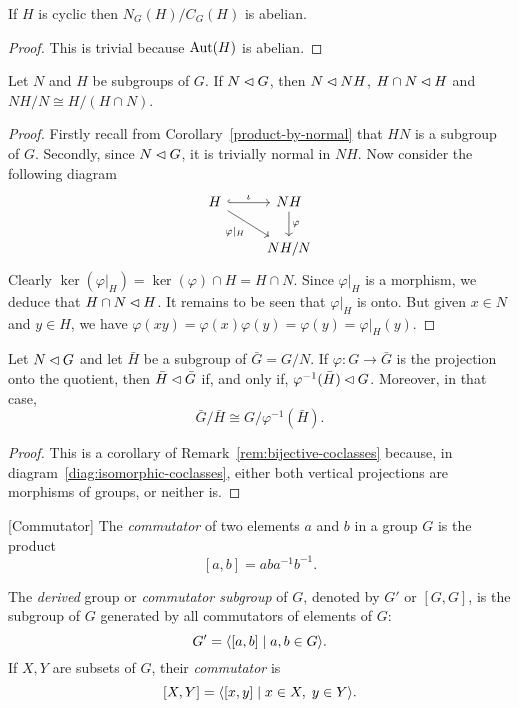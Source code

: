 \begin{cor}
    If\/ $H$ is cyclic then $N_G(H)/C_G(H)$ is abelian. 
\end{cor}

\begin{proof} This is trivial because ${\rm Aut}(H)$ is abelian.  \end{proof}

\begin{prop}\label{prod-quotient}
    Let\/ $N$ and\/ $H$ be subgroups of\/ $G$. If $N \lhd G$, then $N\lhd NH$, $H \cap N \lhd H$ and $NH/N \cong H/(H \cap N)$.
\end{prop}

\begin{proof} Firstly recall from Corollary~\ref{product-by-normal} that $HN$ is a subgroup of $G$. Secondly, since $N\lhd G$, it is trivially normal in $NH$. Now consider the following diagram
$$
    \begin{tikzcd}
        H \arrow[r, "\iota", hook]\arrow[rd,"\varphi|_H", swap]
        & NH \arrow[d, "\varphi"]\\
        & NH/N
    \end{tikzcd}
$$
Clearly $\ker(\varphi|_H)=\ker(\varphi)\cap H= H\cap N$. Since $\varphi|_H$ is a morphism, we deduce that $H\cap N\lhd H$. It remains to be seen that $\varphi|_H$ is onto. But given $x\in N$ and $y\in H$, we have $\varphi(xy) = \varphi(x)\varphi(y) = \varphi(y) = \varphi|_H(y)$.  \end{proof}


\begin{prop}\label{quotient-preserves-normal}
    Let $N\lhd G$ and let $\bar H$ be a subgroup of\/ $\bar G=G/N$. If $\varphi\colon G\to\bar G$ is the projection onto the quotient, then $\bar H\lhd\bar G$ if, and only if, $\varphi^{-1}(\bar H)\lhd G$. Moreover, in that case,
    $$
        \bar G/\bar H\cong G/\varphi^{-1}(\bar H).
    $$
\end{prop}

\begin{proof}
    This is a corollary of Remark~\ref{rem:bijective-coclasses} because, in diagram~\eqref{diag:isomorphic-coclasses}, either both vertical projections are morphisms of groups, or neither is.
\end{proof}

\begin{defns}{\rm[Commutator]}
    The \textsl{commutator} of two elements $a$ and $b$ in a group\/ $G$ is the product 
    $$
        [a,b] = aba^{-1}b^{-1}.
    $$
        
    The \textsl{derived} group or \textsl{commutator subgroup} of\/ $G$, denoted by\/ $G'$ or $[G,G]$, is the subgroup of $G$ generated by all commutators of elements of\/ $G$:
    $$
        G' = \langle[a,b] \mid a,b \in G\rangle.
    $$
    If $X,Y$ are subsets of $G$, their \textsl{commutator} is
    $$
        [X,Y] = \langle[x,y] \mid x\in X,\; y\in Y\rangle.
    $$
\end{defns}

